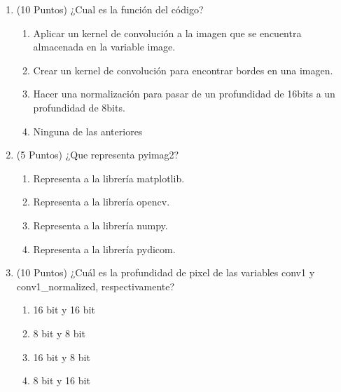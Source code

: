 \documentclass[12pt,a4paper]{article}
\providecommand{\tightlist}{%
  \setlength{\itemsep}{0pt}\setlength{\parskip}{0pt}}\usepackage{longtable,booktabs,array}
\providecommand{\tightlist}{%
  \setlength{\itemsep}{0pt}\setlength{\parskip}{2pt}}
\begin{document}
\begin{enumerate}
\tightlist
\item
  (10 Puntos) ¿Cual es la función del código?

  \begin{enumerate}
  \tightlist
  \item
    Aplicar un kernel de convolución a la imagen que se encuentra
    almacenada en la variable image.
  \item
    Crear un kernel de convolución para encontrar bordes en una imagen.
  \item
    Hacer una normalización para pasar de un profundidad de 16bits a un
    profundidad de 8bits.
  \item
    Ninguna de las anteriores
  \end{enumerate}
\item
  (5 Puntos) ¿Que representa pyimag2?

  \begin{enumerate}
  \tightlist
  \item
    Representa a la librería matplotlib.
  \item
    Representa a la librería opencv.
  \item
    Representa a la librería numpy.
  \item
    Representa a la librería pydicom.
  \end{enumerate}
\item
  (10 Puntos) ¿Cuál es la profundidad de pixel de las variables conv1 y
  conv1\_normalized, respectivamente?

  \begin{enumerate}
  \tightlist
  \item
    16 bit y 16 bit
  \item
    8 bit y 8 bit
  \item
    16 bit y 8 bit
  \item
    8 bit y 16 bit
  \end{enumerate}
\end{enumerate}
\end{document}
